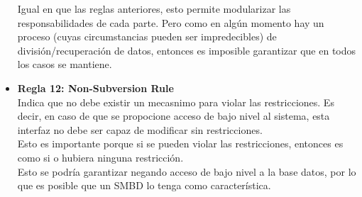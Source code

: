 \documentclass{article}
\begin{document}
\begin{itemize}
        Igual en que las reglas anteriores, esto permite modularizar las
        responsabilidades de cada parte. Pero como en algún momento hay un 
        proceso (cuyas circumstancias pueden ser impredecibles) de 
        división/recuperación de datos, entonces es imposible garantizar que en 
        todos los casos se mantiene.
    	\item\textbf{Regla 12: Non-Subversion Rule}\\
        Indica que no debe existir un mecasnimo para violar las restricciones.
        Es decir, en caso de que se propocione acceso de bajo nivel al sistema, 
        esta interfaz no debe ser capaz de modificar sin restricciones.\\
        Esto es importante porque si se pueden violar las restricciones, entonces 
        es como si o hubiera ninguna restricción.\\
        Esto se podría garantizar negando acceso de bajo nivel a la base datos,
        por lo que es posible que un SMBD lo tenga como característica.
    \end{itemize}
\end{document}

